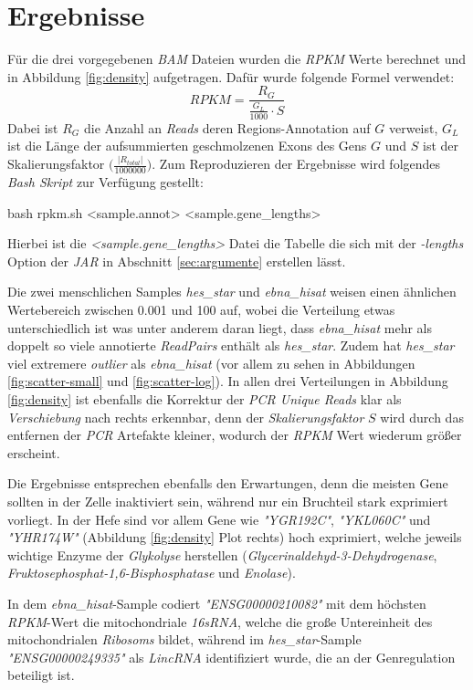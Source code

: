 \documentclass[12pt]{article}
\begin{document}
\section{Ergebnisse}
Für die drei vorgegebenen \textit{BAM} Dateien  wurden die \textit{RPKM} Werte berechnet
und in Abbildung \ref{fig:density} aufgetragen. Dafür wurde folgende Formel verwendet:
\[
    RPKM = \frac{R_{G}}{\frac{G_{L}}{1000} \cdot S}
\]
Dabei ist $R_{G}$ die Anzahl an \textit{Reads} deren Regions-Annotation auf $G$ verweist,
$G_{L}$ ist die Länge der aufsummierten geschmolzenen Exons des Gens $G$ und $S$ ist der
Skalierungsfaktor $\Big(\frac{|R_{total}|}{1000000}\Big)$. Zum Reproduzieren der Ergebnisse 
wird folgendes \textit{Bash Skript} zur Verfügung gestellt:
\begin{verbatim*}
    bash rpkm.sh <sample.annot> <sample.gene_lengths>
\end{verbatim*}
Hierbei ist die \textit{<sample.gene\_lengths>} Datei die Tabelle die sich mit der \textit{-lengths} Option der \textit{JAR} in Abschnitt \ref{sec:argumente}
erstellen lässt.

Die zwei menschlichen Samples \textit{hes\_star} und \textit{ebna\_hisat} weisen einen ähnlichen Wertebereich  zwischen 
0.001 und 100 auf, wobei die Verteilung etwas unterschiedlich ist was unter anderem daran liegt, dass \textit{ebna\_hisat} mehr als
doppelt so viele annotierte \textit{ReadPairs} enthält als \textit{hes\_star}. Zudem hat \textit{hes\_star} viel extremere 
\textit{outlier} als \textit{ebna\_hisat} (vor allem zu sehen in Abbildungen \ref{fig:scatter-small} und \ref{fig:scatter-log}).
In allen drei Verteilungen in Abbildung \ref{fig:density} ist ebenfalls die Korrektur der \textit{PCR Unique Reads} 
klar als \textit{Verschiebung} nach rechts erkennbar, denn der \textit{Skalierungsfaktor} $S$ wird durch das
entfernen der \textit{PCR} Artefakte kleiner, wodurch der \textit{RPKM} Wert wiederum grö\ss er erscheint.

Die Ergebnisse entsprechen ebenfalls den Erwartungen, denn die meisten Gene sollten in der Zelle inaktiviert
sein, während nur ein Bruchteil stark exprimiert vorliegt.
In der Hefe sind vor allem Gene wie \textit{"YGR192C"}, \textit{"YKL060C"} und \textit{"YHR174W"} (Abbildung \ref{fig:density} Plot rechts)
hoch exprimiert, welche jeweils wichtige Enzyme der \textit{Glykolyse} herstellen (\textit{Glycerinaldehyd-3-Dehydrogenase}, \textit{Fruktosephosphat-1,6-Bisphosphatase} und
\textit{Enolase}).

In dem \textit{ebna\_hisat}-Sample codiert \textit{"ENSG00000210082"} mit dem höchsten 
\textit{RPKM}-Wert die mitochondriale \textit{16sRNA}, welche die große Untereinheit 
des mitochondrialen \textit{Ribosoms} bildet, während im \textit{hes\_star}-Sample 
\textit{"ENSG00000249335"} als \textit{LincRNA} identifiziert wurde, die an der Genregulation 
beteiligt ist.
\end{document}
